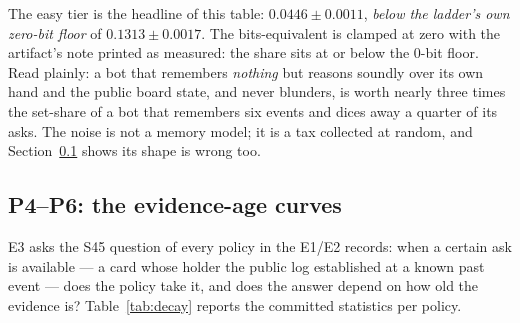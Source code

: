 \documentclass[11pt]{article}
\begin{document}
The easy tier is the headline of this table: $0.0446 \pm 0.0011$, \emph{below the
ladder's own zero-bit floor} of $0.1313 \pm 0.0017$. The bits-equivalent is clamped at
zero with the artifact's note printed as measured: the share sits at or below the 0-bit
floor. Read plainly: a bot that remembers \emph{nothing} but reasons soundly over its
own hand and the public board state, and never blunders, is worth nearly three times
the set-share of a bot that remembers six events and dices away a quarter of its asks. The
noise is not a memory model; it is a tax collected at random, and
Section~\ref{sec:evidence} shows its shape is wrong too.

\subsection{P4--P6: the evidence-age curves}
\label{sec:evidence}

E3 asks the S45 question of every policy in the E1/E2 records: when a certain ask is
available --- a card whose holder the public log established at a known past event ---
does the policy take it, and does the answer depend on how old the evidence is?
Table~\ref{tab:decay} reports the committed statistics per policy.
\end{document}
